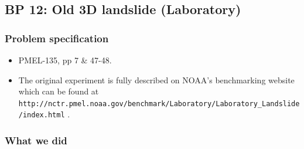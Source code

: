 \subsection{BP 12:
Old  3D landslide (Laboratory)}


\subsubsection{Problem specification}

\begin{itemize}

\item PMEL-135, pp 7 \& 47-48.


\item The original experiment is fully described on NOAA's benchmarking website which can be found at {\tt http://nctr.pmel.noaa.gov/benchmark/Laboratory/Laboratory\_Landslide/index.html}
\cite{NOAAbenchmark:3dlandslide}.

\end{itemize}

\subsubsection{What we did}

